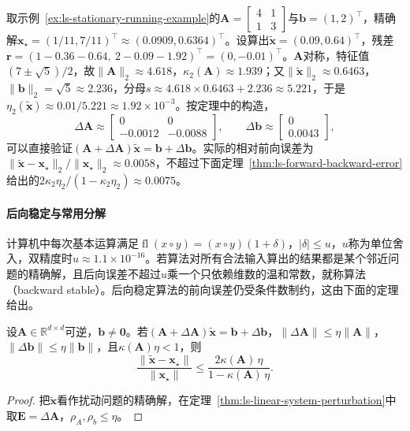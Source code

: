 \begin{example}[计算一次后向误差]
\label{ex:ls-backward-error-computation}
取示例~\ref{ex:ls-stationary-running-example}的$\bm A=\left[\begin{smallmatrix}4&1\\1&3\end{smallmatrix}\right]$与$\bm b=(1,2)^\top$，精确解$\bm x_\star=(1/11,7/11)^\top\approx(0.0909,0.6364)^\top$。设算出$\tilde{\bm x}=(0.09,0.64)^\top$，残差$\bm r=(1-0.36-0.64,\ 2-0.09-1.92)^\top=(0,-0.01)^\top$。$\bm A$对称，特征值$(7\pm\sqrt5)/2$，故$\lVert\bm A\rVert_2\approx4.618$，$\kappa_2(\bm A)\approx1.939$；又$\lVert\tilde{\bm x}\rVert_2\approx0.6463$，$\lVert\bm b\rVert_2=\sqrt5\approx2.236$，分母$s\approx4.618\times0.6463+2.236\approx5.221$，于是$\eta_2(\tilde{\bm x})\approx0.01/5.221\approx1.92\times10^{-3}$。按定理中的构造，
\[
 \Delta\bm A\approx\begin{bmatrix}0&0\\-0.0012&-0.0088\end{bmatrix},\qquad\Delta\bm b\approx\begin{bmatrix}0\\0.0043\end{bmatrix},
\]
可以直接验证$(\bm A+\Delta\bm A)\tilde{\bm x}=\bm b+\Delta\bm b$。实际的相对前向误差为$\lVert\tilde{\bm x}-\bm x_\star\rVert_2/\lVert\bm x_\star\rVert_2\approx0.0058$，不超过下面定理~\ref{thm:ls-forward-backward-error}给出的$2\kappa_2\eta_2/(1-\kappa_2\eta_2)\approx0.0075$。
\end{example}

\paragraph{后向稳定与常用分解}
计算机中每次基本运算满足$\operatorname{fl}(x\circ y)=(x\circ y)(1+\delta)$，$|\delta|\leq u$，$u$称为单位舍入，双精度时$u\approx1.1\times10^{-16}$。若算法对所有合法输入算出的结果都是某个邻近问题的精确解，且后向误差不超过$u$乘一个只依赖维数的温和常数，就称算法（backward stable）。后向稳定算法的前向误差仍受条件数制约，这由下面的定理给出。

\begin{theorem}[由后向误差估计前向误差]
\label{thm:ls-forward-backward-error}
设$\bm A\in\mathbb R^{d\times d}$可逆，$\bm b\ne\bm0$。若$(\bm A+\Delta\bm A)\tilde{\bm x}=\bm b+\Delta\bm b$，$\lVert\Delta\bm A\rVert\leq\eta\lVert\bm A\rVert$，$\lVert\Delta\bm b\rVert\leq\eta\lVert\bm b\rVert$，且$\kappa(\bm A)\eta<1$，则
\[
 \frac{\lVert\tilde{\bm x}-\bm x_\star\rVert}{\lVert\bm x_\star\rVert}\leq\frac{2\kappa(\bm A)\,\eta}{1-\kappa(\bm A)\,\eta}.
\]
\end{theorem}
\begin{proof}
把$\tilde{\bm x}$看作扰动问题的精确解，在定理~\ref{thm:ls-linear-system-perturbation}中取$\bm E=\Delta\bm A$，$\rho_A,\rho_b\leq\eta$。
\end{proof}

